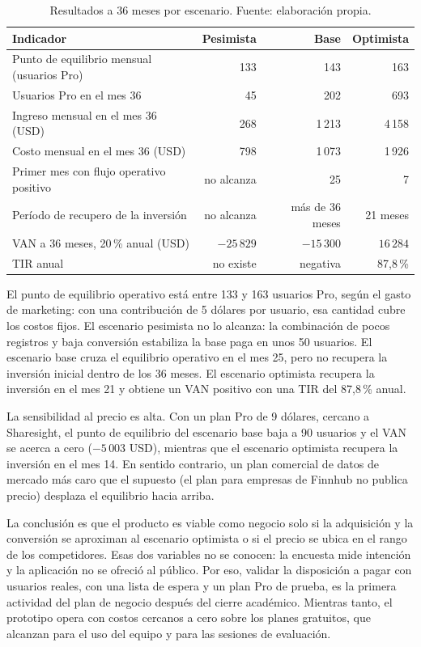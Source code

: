 \begin{table}[ht]
\centering\small\renewcommand{\arraystretch}{1.15}
\caption{Resultados a 36 meses por escenario. Fuente: elaboración propia.}\label{tab:resultados-viabilidad}
\begin{tabular}{>{\raggedright\arraybackslash}p{5.6cm}rrr}\hline
\textbf{Indicador} & \textbf{Pesimista} & \textbf{Base} & \textbf{Optimista}\\\hline
Punto de equilibrio mensual (usuarios Pro) & 133 & 143 & 163\\
Usuarios Pro en el mes 36 & 45 & 202 & 693\\
Ingreso mensual en el mes 36 (USD) & 268 & 1\,213 & 4\,158\\
Costo mensual en el mes 36 (USD) & 798 & 1\,073 & 1\,926\\
Primer mes con flujo operativo positivo & no alcanza & 25 & 7\\
Período de recupero de la inversión & no alcanza & más de 36 meses & 21 meses\\
VAN a 36 meses, 20\,\% anual (USD) & $-25\,829$ & $-15\,300$ & $16\,284$\\
TIR anual & no existe & negativa & 87,8\,\%\\\hline
\end{tabular}
\end{table}


El punto de equilibrio operativo está entre 133 y 163 usuarios Pro, según el gasto de marketing: con una contribución de 5 dólares por usuario, esa cantidad cubre los costos fijos. El escenario pesimista no lo alcanza: la combinación de pocos registros y baja conversión estabiliza la base paga en unos 50 usuarios. El escenario base cruza el equilibrio operativo en el mes 25, pero no recupera la inversión inicial dentro de los 36 meses. El escenario optimista recupera la inversión en el mes 21 y obtiene un VAN positivo con una TIR del 87,8\,\% anual.

La sensibilidad al precio es alta. Con un plan Pro de 9 dólares, cercano a Sharesight, el punto de equilibrio del escenario base baja a 90 usuarios y el VAN se acerca a cero ($-5\,003$ USD), mientras que el escenario optimista recupera la inversión en el mes 14. En sentido contrario, un plan comercial de datos de mercado más caro que el supuesto (el plan para empresas de Finnhub no publica precio) desplaza el equilibrio hacia arriba.

La conclusión es que el producto es viable como negocio solo si la adquisición y la conversión se aproximan al escenario optimista o si el precio se ubica en el rango de los competidores. Esas dos variables no se conocen: la encuesta mide intención y la aplicación no se ofreció al público. Por eso, validar la disposición a pagar con usuarios reales, con una lista de espera y un plan Pro de prueba, es la primera actividad del plan de negocio después del cierre académico. Mientras tanto, el prototipo opera con costos cercanos a cero sobre los planes gratuitos, que alcanzan para el uso del equipo y para las sesiones de evaluación.

